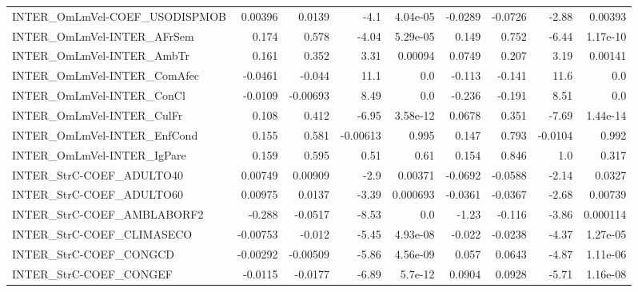 \begin{tabular}{lrrrrrrrr}
INTER\_OmLmVel-COEF\_USODISPMOB          &     0.00396 &       0.0139 &     -4.1 & 4.04e-05 &    -0.0289 &     -0.0726 &        -2.88 &       0.00393 \\
INTER\_OmLmVel-INTER\_AFrSem             &       0.174 &        0.578 &    -4.04 & 5.29e-05 &      0.149 &       0.752 &        -6.44 &      1.17e-10 \\
INTER\_OmLmVel-INTER\_AmbTr              &       0.161 &        0.352 &     3.31 &  0.00094 &     0.0749 &       0.207 &         3.19 &       0.00141 \\
INTER\_OmLmVel-INTER\_ComAfec            &     -0.0461 &       -0.044 &     11.1 &      0.0 &     -0.113 &      -0.141 &         11.6 &           0.0 \\
INTER\_OmLmVel-INTER\_ConCl              &     -0.0109 &     -0.00693 &     8.49 &      0.0 &     -0.236 &      -0.191 &         8.51 &           0.0 \\
INTER\_OmLmVel-INTER\_CulFr              &       0.108 &        0.412 &    -6.95 & 3.58e-12 &     0.0678 &       0.351 &        -7.69 &      1.44e-14 \\
INTER\_OmLmVel-INTER\_EnfCond            &       0.155 &        0.581 & -0.00613 &    0.995 &      0.147 &       0.793 &      -0.0104 &         0.992 \\
INTER\_OmLmVel-INTER\_IgPare             &       0.159 &        0.595 &     0.51 &     0.61 &      0.154 &       0.846 &          1.0 &         0.317 \\
INTER\_StrC-COEF\_ADULTO40               &     0.00749 &      0.00909 &     -2.9 &  0.00371 &    -0.0692 &     -0.0588 &        -2.14 &        0.0327 \\
INTER\_StrC-COEF\_ADULTO60               &     0.00975 &       0.0137 &    -3.39 & 0.000693 &    -0.0361 &     -0.0367 &        -2.68 &       0.00739 \\
INTER\_StrC-COEF\_AMBLABORF2             &      -0.288 &      -0.0517 &    -8.53 &      0.0 &      -1.23 &      -0.116 &        -3.86 &      0.000114 \\
INTER\_StrC-COEF\_CLIMASECO              &    -0.00753 &       -0.012 &    -5.45 & 4.93e-08 &     -0.022 &     -0.0238 &        -4.37 &      1.27e-05 \\
INTER\_StrC-COEF\_CONGCD                 &    -0.00292 &     -0.00509 &    -5.86 & 4.56e-09 &      0.057 &      0.0643 &        -4.87 &      1.11e-06 \\
INTER\_StrC-COEF\_CONGEF                 &     -0.0115 &      -0.0177 &    -6.89 &  5.7e-12 &     0.0904 &      0.0928 &        -5.71 &      1.16e-08 \\

\end{tabular}
